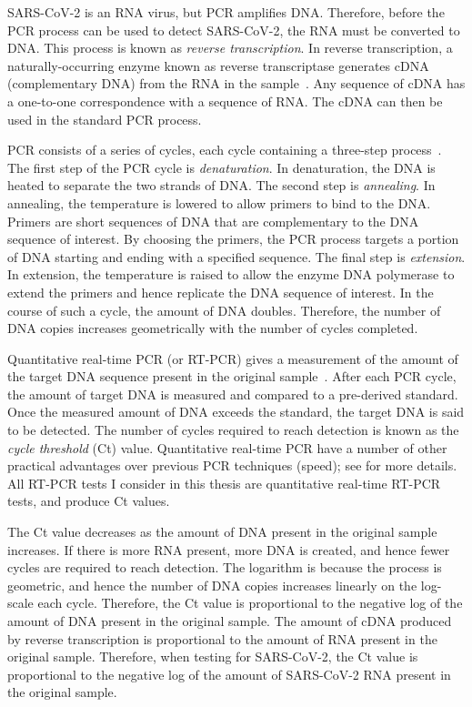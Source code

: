 \documentclass[thesis.tex]{subfiles}
\begin{document}
SARS-CoV-2 is an RNA virus, but PCR amplifies DNA.
Therefore, before the PCR process can be used to detect SARS-CoV-2, the RNA must be converted to DNA.
This process is known as \emph{reverse transcription}.
In reverse transcription, a naturally-occurring enzyme known as reverse transcriptase generates cDNA (complementary DNA) from the RNA in the sample~\autocites{valasekPower}.
Any sequence of cDNA has a one-to-one correspondence with a sequence of RNA.
The cDNA can then be used in the standard PCR process.

PCR consists of a series of cycles, each cycle containing a three-step process~\autocites{powledgePCR}{garibyanPCR}.
The first step of the PCR cycle is \emph{denaturation}.
In denaturation, the DNA is heated to separate the two strands of DNA.
The second step is \emph{annealing}.
In annealing, the temperature is lowered to allow primers to bind to the DNA.
Primers are short sequences of DNA that are complementary to the DNA sequence of interest.
By choosing the primers, the PCR process targets a portion of DNA starting and ending with a specified sequence.
The final step is \emph{extension}.
In extension, the temperature is raised to allow the enzyme DNA polymerase to extend the primers and hence replicate the DNA sequence of interest.
In the course of such a cycle, the amount of DNA doubles.
Therefore, the number of DNA copies increases geometrically with the number of cycles completed.

Quantitative real-time PCR (or RT-PCR) gives a measurement of the amount of the target DNA sequence present in the original sample~\autocite{yangPCRdiagnostics}.
After each PCR cycle, the amount of target DNA is measured and compared to a pre-derived standard.
Once the measured amount of DNA exceeds the standard, the target DNA is said to be detected.
The number of cycles required to reach detection is known as the \emph{cycle threshold} (Ct) value.
Quantitative real-time PCR have a number of other practical advantages over previous PCR techniques (\eg speed); see \textcites{yangPCRdiagnostics}{valasekPower} for more details.
All RT-PCR tests I consider in this thesis are quantitative real-time RT-PCR tests, and produce Ct values.

The Ct value decreases as the amount of DNA present in the original sample increases.
If there is more RNA present, more DNA is created, and hence fewer cycles are required to reach detection.
The logarithm is because the process is geometric, and hence the number of DNA copies increases linearly on the log-scale each cycle.
Therefore, the Ct value is proportional to the negative log of the amount of DNA present in the original sample.
The amount of cDNA produced by reverse transcription is proportional to the amount of RNA present in the original sample.
Therefore, when testing for SARS-CoV-2, the Ct value is proportional to the negative log of the amount of SARS-CoV-2 RNA present in the original sample.
\end{document}
